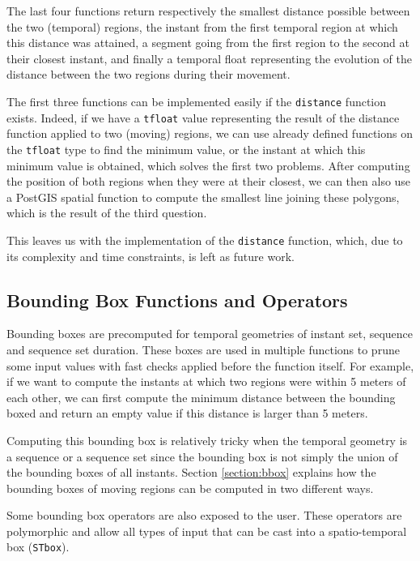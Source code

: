 The last four functions return respectively the smallest distance possible between the two (temporal) regions, the instant from the first temporal region at which this distance was attained, a segment going from the first region to the second at their closest instant, and finally a temporal float representing the evolution of the distance between the two regions during their movement. 

The first three functions can be implemented easily if the \lstinline{distance} function exists. Indeed, if we have a \lstinline+tfloat+ value representing the result of the distance function applied to two (moving) regions, we can use already defined functions on the \lstinline+tfloat+ type to find the minimum value, or the instant at which this minimum value is obtained, which solves the first two problems. After computing the position of both regions when they were at their closest, we can then also use a PostGIS spatial function to compute the smallest line joining these polygons, which is the result of the third question.

This leaves us with the implementation of the \lstinline{distance} function, which, due to its complexity and time constraints, is left as future work.

\subsection{Bounding Box Functions and Operators}
\label{section:bbox_funcs}

Bounding boxes are precomputed for temporal geometries of instant set, sequence and sequence set duration. These boxes are used in multiple functions to prune some input values with fast checks applied before the function itself. For example, if we want to compute the instants at which two regions were within 5 meters of each other, we can first compute the minimum distance between the bounding boxed and return an empty value if this distance is larger than 5 meters.

Computing this bounding box is relatively tricky when the temporal geometry is a sequence or a sequence set since the bounding box is not simply the union of the bounding boxes of all instants. Section \ref{section:bbox} explains how the bounding boxes of moving regions can be computed in two different ways.

Some bounding box operators are also exposed to the user. These operators are polymorphic and allow all types of input that can be cast into a spatio-temporal box (\lstinline+STbox+). 

